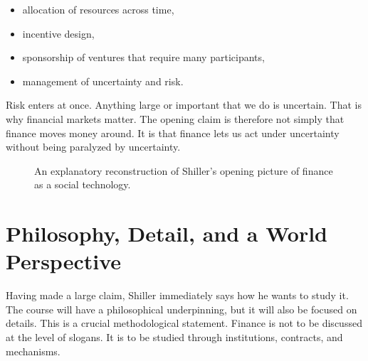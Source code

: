 \begin{itemize}
\item allocation of resources across time,
\item incentive design,
\item sponsorship of ventures that require many participants,
\item management of uncertainty and risk.
\end{itemize}

Risk enters at once. Anything large or important that we do is uncertain. That is why financial markets matter. The opening claim is therefore not simply that finance moves money around. It is that finance lets us act under uncertainty without being paralyzed by uncertainty.

\begin{figure}[h]
\centering
{}
\caption{An explanatory reconstruction of Shiller's opening picture of finance as a social technology.}
\end{figure}

\section{Philosophy, Detail, and a World Perspective}

Having made a large claim, Shiller immediately says how he wants to study it. The course will have a philosophical underpinning, but it will also be focused on details. This is a crucial methodological statement. Finance is not to be discussed at the level of slogans. It is to be studied through institutions, contracts, and mechanisms.

